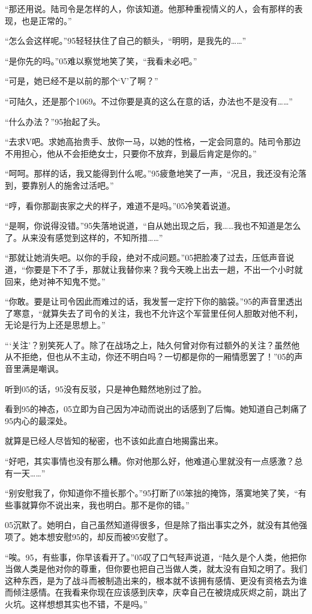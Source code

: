 “那还用说。陆司令是怎样的人，你该知道。他那种重视情义的人，会有那样的表现，也是正常的。”

“怎么会这样呢。”95轻轻扶住了自己的额头，“明明，是我先的……”

“是你先的吗。”05难以察觉地笑了笑，“我看未必吧。”

“可是，她已经不是以前的那个‘V’了啊？”

“可陆久，还是那个1069。不过你要是真的这么在意的话，办法也不是没有……”

“什么办法？”95抬起了头。

“去求V吧。求她高抬贵手、放你一马，以她的性格，一定会同意的。陆司令那边不用担心，他从不会拒绝女士，只要你不放弃，到最后肯定是你的。”

“呵呵。那样的话，我又能得到什么呢。”95疲惫地笑了一声，“况且，我还没有沦落到，要靠别人的施舍过活吧。”

“哼，看你那副丧家之犬的样子，难道不是吗。”05冷笑着说道。

“是啊，你说得没错。”95失落地说道，“自从她出现之后，我……我也不知道是怎么了。从来没有感觉到这样的，不知所措……”

“那就让她消失吧。以你的手段，绝对不成问题。”05把脸凑了过去，压低声音说道，“你要是下不了手，那就让我替你来？我今天晚上出去一趟，不出一个小时就回来，绝对神不知鬼不觉。”

“你敢。要是让司令因此而难过的话，我发誓一定拧下你的脑袋。”95的声音里透出了寒意，“就算失去了司令的关注，我也不允许这个军营里任何人胆敢对他不利，无论是行为上还是思想上。”

“‘关注’？别笑死人了。除了在战场之上，陆久何曾对你有过额外的关注？虽然他从不拒绝，但也从不主动，你还不明白吗？一切都是你的一厢情愿罢了！”05的声音里满是嘲讽。

听到05的话，95没有反驳，只是神色黯然地别过了脸。

看到95的神态，05立即为自己因为冲动而说出的话感到了后悔。她知道自己刺痛了95内心的最深处。

就算是已经人尽皆知的秘密，也不该如此直白地揭露出来。

“好吧，其实事情也没有那么糟。你对他那么好，他难道心里就没有一点感激？总有一天……”

“别安慰我了，你知道你不擅长那个。”95打断了05笨拙的掩饰，落寞地笑了笑，“有些事就算你不说出来，我也明白。那不是你的错。”

05沉默了。她明白，自己虽然知道得很多，但是除了指出事实之外，就没有其他强项了。她本想安慰95的，却反而被95安慰了。

“唉。95，有些事，你早该看开了。”05叹了口气轻声说道，“陆久是个人类，他把你当做人类是他对你的尊重，但你要也把自己当做人类，就太没有自知之明了。我们这种东西，是为了战斗而被制造出来的，根本就不该拥有感情、更没有资格去为谁而倾注感情。在我看来你现在应该感到庆幸，庆幸自己在被烧成灰烬之前，跳出了火坑。这样想想其实也不错，不是吗。”

